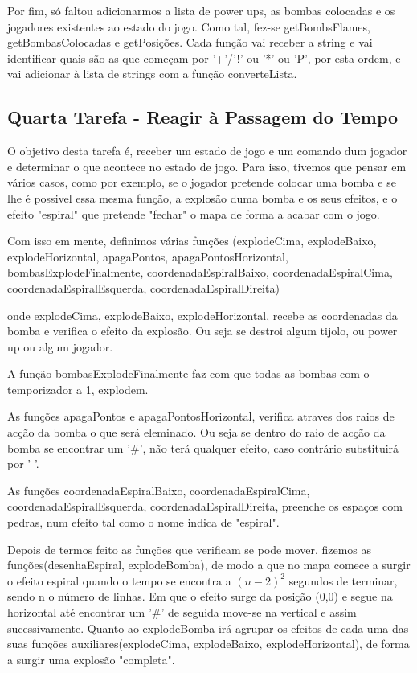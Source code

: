 \documentclass[a4paper]{article}
\begin{document}
Por fim, só faltou adicionarmos a lista de power ups, as bombas colocadas e os jogadores existentes ao estado do jogo. Como tal, fez-se getBombsFlames, getBombasColocadas e getPosições. Cada função vai
receber a string e vai identificar quais são as que começam por '+'/'!' ou '*' ou 'P', por esta ordem, e vai adicionar à lista de strings com a função converteLista.

\subsection{Quarta Tarefa - Reagir à Passagem do Tempo}
\label{subsec:tarefa4sol}

O objetivo desta tarefa é, receber um estado de jogo e um comando dum jogador e determinar o que acontece no estado de jogo.
Para isso, tivemos que pensar em vários casos, como por exemplo, se o jogador pretende colocar uma bomba e se lhe é possivel essa mesma função, a explosão duma bomba e os seus efeitos, e o efeito "espiral" que pretende "fechar" o mapa de forma a acabar com o jogo.

Com isso em mente, definimos várias funções (explodeCima, explodeBaixo, explodeHorizontal, apagaPontos, apagaPontosHorizontal, bombasExplodeFinalmente, coordenadaEspiralBaixo, coordenadaEspiralCima, coordenadaEspiralEsquerda, coordenadaEspiralDireita)

onde explodeCima, explodeBaixo, explodeHorizontal, recebe as coordenadas da bomba e verifica o efeito da explosão. Ou seja se destroi algum tijolo, ou power up ou algum jogador.

A função bombasExplodeFinalmente faz com que todas as bombas com o temporizador a 1, explodem.

As funções apagaPontos e apagaPontosHorizontal, verifica atraves dos raios de acção da bomba o que será eleminado. Ou seja se dentro do raio de acção da bomba se encontrar um '\#', não terá qualquer efeito, caso contrário substituirá por ' '.

As funções coordenadaEspiralBaixo, coordenadaEspiralCima, coordenadaEspiralEsquerda, coordenadaEspiralDireita, preenche os espaços com pedras, num efeito tal como o nome indica de "espiral".

Depois de termos feito as funções que verificam se pode mover, fizemos as funções(desenhaEspiral, explodeBomba), de modo a que no mapa comece a surgir o efeito espiral quando o tempo se encontra a ${(n-2)}^2$ segundos de terminar, sendo n o número de linhas. Em que o efeito surge da posição (0,0) e segue na horizontal até encontrar um '\#' de seguida move-se na vertical e assim sucessivamente. Quanto ao explodeBomba irá agrupar os efeitos de cada uma das suas funções auxiliares(explodeCima, explodeBaixo, explodeHorizontal), de forma a surgir uma explosão "completa".
\end{document}
